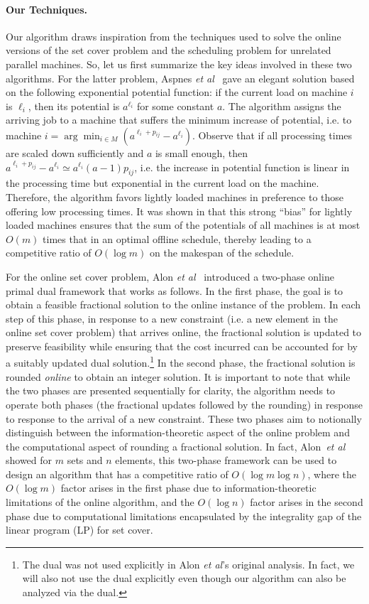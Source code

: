 \documentclass[11pt]{article}
\begin{document}
\paragraph{Our Techniques.}
Our algorithm draws inspiration from the techniques used to solve the online 
versions of the set cover problem and the scheduling problem for unrelated 
parallel machines. So, let us first summarize the key ideas involved in these
two algorithms. For the latter problem, Aspnes {\em et al}~\cite{AspnesAFPW97} 
gave an elegant solution based on the following exponential potential function: 
if the current load on machine $i$ is
$\ell_i$, then its potential is  $a^{\ell_i}$ for some constant $a$. 
The algorithm assigns the arriving job to a machine that suffers the minimum
increase of potential, i.e. to machine 
$i = \arg\min_{i\in M} (a^{\ell_i+p_{ij}} - a^{\ell_i})$. Observe that if all
processing times are scaled down sufficiently and $a$ is small enough, then
$a^{\ell_i + p_{ij}} - a^{\ell_i} \simeq a^{\ell_i} (a-1) p_{ij}$, i.e. the 
increase in potential function is linear in the processing time but exponential
in the current load on the machine. Therefore, the algorithm favors 
lightly loaded machines in preference to those offering low processing times.
It was shown in \cite{AspnesAFPW97} that this strong ``bias'' for lightly loaded 
machines ensures that the sum of the potentials of all machines is at most 
$O(m)$ times that in an optimal offline schedule, thereby leading to a competitive 
ratio of $O(\log m)$ on the makespan of the schedule. 

For the online set cover problem, Alon {\em et al}~\cite{AlonAABN09} introduced 
a two-phase online primal dual framework that works as follows. In the first 
phase, the goal is to obtain a feasible fractional solution to the online 
instance of the problem. In each step of this phase, in response to a new 
constraint (i.e. a new element in the online set cover problem) 
that arrives online, the fractional solution is updated to preserve 
feasibility while ensuring that the cost incurred can be accounted for by a 
suitably updated dual solution.\footnote{The dual was not used explicitly in Alon 
{\em et al}'s original analysis. In fact, we will also not use the dual explicitly
even though our algorithm can also be analyzed via the dual.}
In the second phase, the fractional solution is rounded {\em online} to obtain 
an integer solution. It is important to note that while the two phases are presented
sequentially for clarity, the algorithm needs to operate both phases (the fractional
updates followed by the rounding) in response
to response to the arrival of a new constraint. 
These two phases aim to notionally distinguish between 
the information-theoretic aspect of the online problem and the computational aspect
of rounding a fractional solution. In fact, Alon~{\em et al} showed 
for $m$ sets and $n$ elements, this two-phase framework can be used to 
design an algorithm that has a competitive ratio of $O(\log m\log n)$, where the 
$O(\log m)$ factor arises in the first phase due to information-theoretic
limitations of the online algorithm, and the $O(\log n)$ factor arises in the
second phase due to computational limitations encapsulated by the integrality
gap of the linear program (LP) for set cover.
\end{document}
